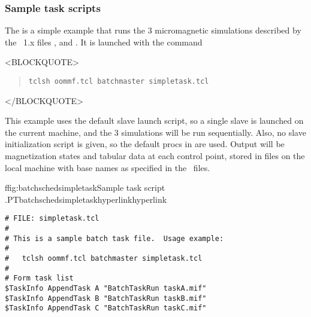 \subsubsection{Sample task scripts}\label{sec:batchschedex}\par
The
 is a simple example that runs the
3 micromagnetic simulations described by the \MIF~1.x files
,  and .  It
is launched with the command
\begin{rawhtml}
<BLOCKQUOTE>
\end{rawhtml}
\begin{quote}
\begin{verbatim}
tclsh oommf.tcl batchmaster simpletask.tcl
\end{verbatim}
\end{quote}
\begin{rawhtml}
</BLOCKQUOTE>
\end{rawhtml}
This example uses the default slave launch script, so a single slave is
launched on the current machine, and the 3 simulations will be run
sequentially.  Also, no slave initialization script is given, so the
default procs in  are used.  Output will be magnetization
states and tabular data
at each control point, stored in
files on the local machine with base names as specified in the \MIF\
files.

\begin{codelisting}{f}{fig:batchschedsimpletask}{Sample task script
  \fn{simpletask.tcl}.}{PTbatchschedsimpletask}{hyperlink}{hyperlink}
\begin{verbatim}
# FILE: simpletask.tcl
#
# This is a sample batch task file.  Usage example:
#
#   tclsh oommf.tcl batchmaster simpletask.tcl
#
# Form task list
$TaskInfo AppendTask A "BatchTaskRun taskA.mif"
$TaskInfo AppendTask B "BatchTaskRun taskB.mif"
$TaskInfo AppendTask C "BatchTaskRun taskC.mif"
\end{verbatim}
\end{codelisting}

